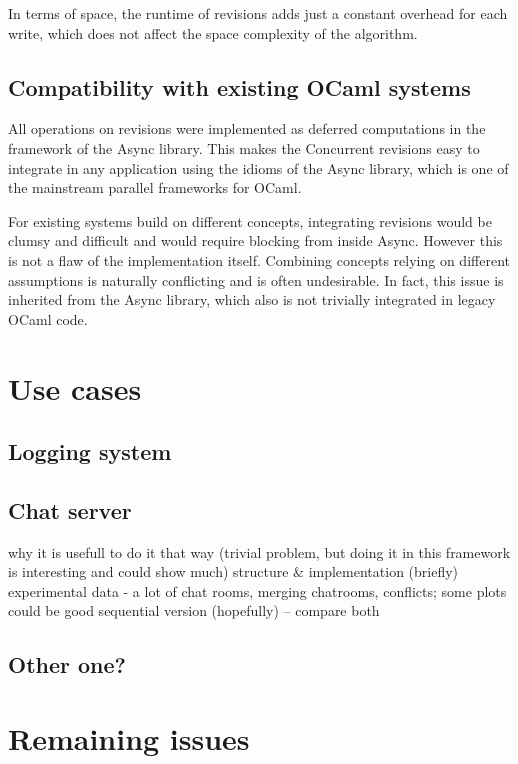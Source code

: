 \documentclass[12pt,twoside,notitlepage]{report}
\begin{document}
In terms of space, the runtime of revisions adds just a constant overhead for each write, which does not affect the space complexity of the algorithm.     

\subsection{Compatibility with existing OCaml systems}
All operations on revisions were implemented as deferred computations in the framework of the Async library. This makes the Concurrent revisions easy to integrate in any application using the idioms of the Async library, which is one of the mainstream parallel frameworks for OCaml.

For existing systems build on different concepts, integrating revisions would be clumsy and difficult and would require blocking from inside Async. However this is not a flaw of the implementation itself. Combining concepts relying on different assumptions is naturally conflicting and is often undesirable. In fact, this issue is inherited from the Async library, which also is not trivially integrated in legacy OCaml code.     
 
\section{Use cases}
\subsection{Logging system}
\subsection{Chat server}

 
 
 why it is usefull to do it that way (trivial problem, but doing it in this framework is interesting and could show much)
structure \& implementation (briefly)
experimental data - a lot of chat rooms, merging chatrooms, conflicts; some plots could be good
sequential version (hopefully) – compare both
   
\subsection{Other one?}

\section{Remaining issues}
\end{document}
